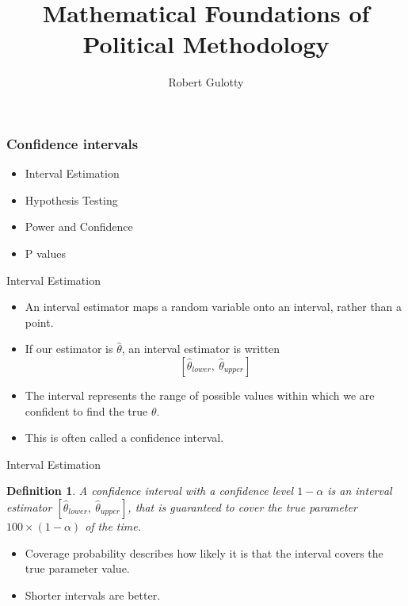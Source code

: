 \documentclass{beamer}
\title[PLSC 43401]{Mathematical Foundations of Political Methodology}
\author{Robert Gulotty}
\institute[Chicago]{University of Chicago}
\newtheorem{defn}{Definition}
\numberwithin{equation}{section}
\begin{document}
\begin{frame}
\maketitle
\end{frame}


\begin{frame}
\frametitle{Confidence intervals}
\begin{itemize}
\item Interval Estimation
\item Hypothesis Testing
\item Power and Confidence
\item P values
\end{itemize}
\end{frame}



\begin{frame}{Interval Estimation}
\begin{itemize}
\item An interval estimator maps a random variable onto an interval, rather than a point.\pause
\item If our estimator is $\hat{\theta}$, an interval estimator is written 
$$[\hat{\theta}_{lower},\ \hat{\theta}_{upper}]$$\pause
\item The interval represents the range of possible values within which we are confident to find the true $\theta$. \pause
\item This is often called a confidence interval.
\end{itemize}
\end{frame}



\begin{frame}{Interval Estimation}
\begin{defn}
A confidence interval with a confidence level $1-\alpha$ is an interval estimator $[\hat{\theta}_{lower},\ \hat{\theta}_{upper}]$, that is guaranteed to cover the true parameter $100\times (1-\alpha)$ of the time.\pause
\end{defn}
\begin{itemize}
\item Coverage probability describes how likely it is that the interval covers the true parameter value.\pause
\item Shorter intervals are better.
\end{itemize}
\end{frame}
\end{document}
